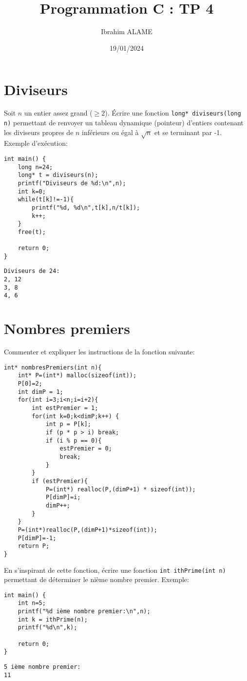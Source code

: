 \documentclass{article}
\title{Programmation C : TP 4}
\author{Ibrahim ALAME}
\date{19/01/2024}
\begin{document}
\maketitle

\section*{Diviseurs}
Soit $n$ un entier assez grand ($\geq 2$). Écrire une fonction {\tt long* diviseurs(long n)} permettant de renvoyer un tableau dynamique (pointeur) d'entiers contenant les diviseurs propres de $n$ inférieurs ou égal à $\sqrt n$ et se terminant par -1. Exemple d'exécution:
\begin{verbatim}
int main() {
	long n=24;
    long* t = diviseurs(n);
    printf("Diviseurs de %d:\n",n);
    int k=0;
    while(t[k]!=-1){
        printf("%d, %d\n",t[k],n/t[k]);
        k++;
    }
    free(t);

    return 0;
}    
\end{verbatim}
\begin{verbatim}
Diviseurs de 24:
2, 12
3, 8
4, 6
\end{verbatim}
\section*{Nombres premiers}
Commenter et expliquer les instructions de la fonction suivante:
\begin{verbatim}
int* nombresPremiers(int n){
    int* P=(int*) malloc(sizeof(int));
    P[0]=2;
    int dimP = 1;
    for(int i=3;i<n;i=i+2){
        int estPremier = 1;
        for(int k=0;k<dimP;k++) {
            int p = P[k];
            if (p * p > i) break;
            if (i % p == 0){
                estPremier = 0;
                break;
            }
        }
        if (estPremier){
            P=(int*) realloc(P,(dimP+1) * sizeof(int));
            P[dimP]=i;
            dimP++;
        }
    }
    P=(int*)realloc(P,(dimP+1)*sizeof(int));
    P[dimP]=-1;
    return P;
}

\end{verbatim}
En s'inspirant de cette fonction, écrire une fonction {\tt int ithPrime(int n)} permettant de déterminer le nième nombre premier. Exemple:
\begin{verbatim}
int main() {
	int n=5;
	printf("%d ième nombre premier:\n",n);
	int k = ithPrime(n);
    printf("%d\n",k);

    return 0;
}    
\end{verbatim}
\begin{verbatim}
5 ième nombre premier:
11
\end{verbatim}
\end{document}
